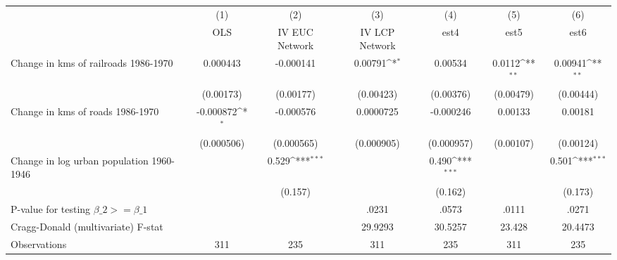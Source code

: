 {
\def\sym#1{\ifmmode^{#1}\else\(^{#1}\)\fi}
\begin{tabular}{l*{6}{c}}
\hline\hline
                &\multicolumn{1}{c}{(1)}&\multicolumn{1}{c}{(2)}&\multicolumn{1}{c}{(3)}&\multicolumn{1}{c}{(4)}&\multicolumn{1}{c}{(5)}&\multicolumn{1}{c}{(6)}\\
                &\multicolumn{1}{c}{OLS}&\multicolumn{1}{c}{IV EUC Network}&\multicolumn{1}{c}{IV LCP Network}&\multicolumn{1}{c}{est4}&\multicolumn{1}{c}{est5}&\multicolumn{1}{c}{est6}\\
\hline
Change in kms of railroads 1986-1970& 0.000443         &-0.000141         &  0.00791\sym{*}  &  0.00534         &   0.0112\sym{**} &  0.00941\sym{**} \\
                &(0.00173)         &(0.00177)         &(0.00423)         &(0.00376)         &(0.00479)         &(0.00444)         \\
[1em]
Change in kms of roads 1986-1970&-0.000872\sym{*}  &-0.000576         &0.0000725         &-0.000246         &  0.00133         &  0.00181         \\
                &(0.000506)         &(0.000565)         &(0.000905)         &(0.000957)         &(0.00107)         &(0.00124)         \\
[1em]
Change in log urban population 1960-1946&                  &    0.529\sym{***}&                  &    0.490\sym{***}&                  &    0.501\sym{***}\\
                &                  &  (0.157)         &                  &  (0.162)         &                  &  (0.173)         \\
\hline
P-value for testing $\beta\_{2} >= \beta\_{1}$&                  &                  &    .0231         &    .0573         &    .0111         &    .0271         \\
Cragg-Donald (multivariate) F-stat&                  &                  &  29.9293         &  30.5257         &   23.428         &  20.4473         \\
Observations    &      311         &      235         &      311         &      235         &      311         &      235         \\
\hline\hline
\end{tabular}
}
